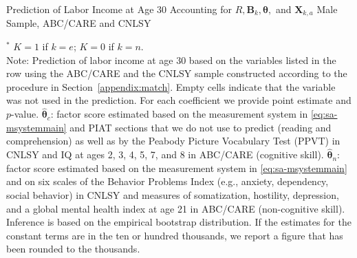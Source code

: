 \begin{table}
\begin{threeparttable}
\caption{Prediction of Labor Income at Age 30 Accounting for $R, \bm{B}_k, \bm{\theta},$ and $\bm{X}_{k,a}$ Male Sample, ABC/CARE and CNLSY}
\label{table:end2}
\centering
\scriptsize

\begin{tablenotes}
\footnotesize
\item $^\ast$ $K=1$ if $k=e$; $K=0$ if $k=n$.\\ 
Note: Prediction of labor income at age 30 based on the variables listed in the row using the ABC/CARE and the CNLSY sample constructed according to the procedure in Section~\ref{appendix:match}. Empty cells indicate that the variable was not used in the prediction. For each coefficient we provide point estimate and $p$-value. $\hat{\bm{\theta}}_{c}$: factor score estimated based on the measurement system in \eqref{eq:sa-msystemmain} and PIAT sections that we do not use to predict (reading and comprehension) as well as by the Peabody Picture Vocabulary Test (PPVT) in CNLSY and IQ at ages 2, 3, 4, 5, 7, and 8 in ABC/CARE (cognitive skill). $\hat{\bm{\theta}}_{n}$: factor score estimated based on the measurement system in \eqref{eq:sa-msystemmain} and on six scales of the Behavior Problems Index (e.g., anxiety, dependency, social behavior) in CNLSY and measures of somatization, hostility, depression, and a global mental health index at age 21 in ABC/CARE (non-cognitive skill). Inference is based on the empirical bootstrap distribution. If the estimates for the constant terms are in the ten or hundred thousands, we report a figure that has been rounded to the thousands.
\end{tablenotes}
\end{threeparttable}
\end{table}

